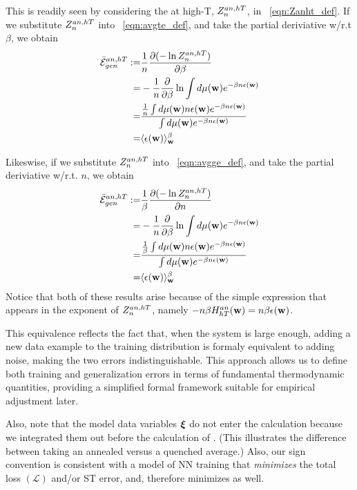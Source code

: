 This is readily seen by considering the \Annealed \PartitionFunction at high-T, $Z^{an,hT}_{n}$, in \EQN~\ref{eqn:Zanht_def}.
If we substitute $Z^{an,hT}_{n}$ into \EQN~\ref{eqn:avgte_def}, and take the partial deriviative w/r.t $\beta$, we obtain
\begin{align}
  \label{eqn:avgte_anhT}
  \bar{\mathcal{E}}_{gen}^{an, hT} :=&\frac{1}{n}\dfrac{\partial (-\ln Z^{an,hT}_{n})}{\partial \beta}  \\ \nonumber
   =& - \dfrac{1}{n}\dfrac{\partial}{\partial \beta}\ln\int d\mu({\mathbf{w}})e^{-\beta n\epsilon({\mathbf{w}})} \\  \nonumber
   =&  \dfrac{
              \tfrac{1}{n}  \int  d\mu({\mathbf{w}}) n\epsilon({\mathbf{w}}) e^{-\beta n\epsilon({\mathbf{w}})} 
             }{
              \int  d\mu({\mathbf{w}}) e^{-\beta n\epsilon({\mathbf{w}})} 
   } \\ \nonumber
   =&\langle\epsilon({\mathbf{w}}) \rangle_{{\mathbf{w}}}^{\beta}
  \end{align}


Likeswise, if we substitute $Z^{an,hT}_{n}$ into \EQN~\ref{eqn:avgge_def}, and take the partial deriviative w/r.t. $n$, we obtain
\begin{align}
  \label{eqn:avgte_anhT}
    \bar{\mathcal{E}}_{gen}^{an, hT}  :=& \frac{1}{\beta}\dfrac{\partial (-\ln Z^{an,hT}_{n})}{\partial n} \\ \nonumber
    =& - \dfrac{1}{n}\dfrac{\partial}{\partial \beta}\ln\int d\mu({\mathbf{w}})e^{-\beta n\epsilon({\mathbf{w}})} \\  \nonumber
   =&  \dfrac{
              \tfrac{1}{\beta}  \int  d\mu({\mathbf{w}}) n\epsilon({\mathbf{w}}) e^{-\beta n\epsilon({\mathbf{w}})} 
             }{
     \int  d\mu({\mathbf{w}}) e^{-\beta n\epsilon({\mathbf{w}})} 
   } \\ \nonumber
   =&\langle\epsilon({\mathbf{w}}) \rangle_{{\mathbf{w}}}^{\beta}
  \end{align}
  Notice that both of these results arise
  because of the simple expression that appears in the exponent of $Z^{an,hT}_{n}$, namely $-n\beta H^{an}_{hT}({\mathbf{w}})=n\beta\epsilon({\mathbf{w}})$.


This equivalence reflects the fact that, when the system is large enough, adding a new data example to the
training distribution is formaly equivalent to adding noise, making the two errors indistinguishable.
This approach allows us to define both training and generalization errors in terms of fundamental thermodynamic quantities,
providing a simplified formal framework suitable for empirical adjustment later.

Also, note that the model data variables $\boldsymbol{\xi}$ do not enter the calculation because we 
integrated them out before the calculation of \ThermalAverage.
(This illustrates the difference between taking an annealed versus a quenched average.)
Also, our sign convention is consistent with a model of NN training that \emph{minimizes} the total loss
$(\mathcal{L})$ and/or ST error, and, therefore minimizes \FreeEnergies as well.

